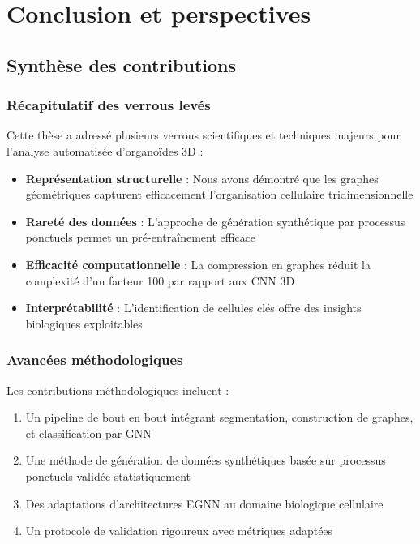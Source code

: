 
\chapter{Conclusion et perspectives}

\section{Synthèse des contributions}

\subsection{Récapitulatif des verrous levés}

Cette thèse a adressé plusieurs verrous scientifiques et techniques majeurs pour l'analyse automatisée d'organoïdes 3D :
\begin{itemize}
    \item \textbf{Représentation structurelle} : Nous avons démontré que les graphes géométriques capturent efficacement l'organisation cellulaire tridimensionnelle
    \item \textbf{Rareté des données} : L'approche de génération synthétique par processus ponctuels permet un pré-entraînement efficace
    \item \textbf{Efficacité computationnelle} : La compression en graphes réduit la complexité d'un facteur 100 par rapport aux CNN 3D
    \item \textbf{Interprétabilité} : L'identification de cellules clés offre des insights biologiques exploitables
\end{itemize}

\subsection{Avancées méthodologiques}

Les contributions méthodologiques incluent :
\begin{enumerate}
    \item Un pipeline de bout en bout intégrant segmentation, construction de graphes, et classification par GNN
    \item Une méthode de génération de données synthétiques basée sur processus ponctuels validée statistiquement
    \item Des adaptations d'architectures EGNN au domaine biologique cellulaire
    \item Un protocole de validation rigoureux avec métriques adaptées
\end{enumerate}

